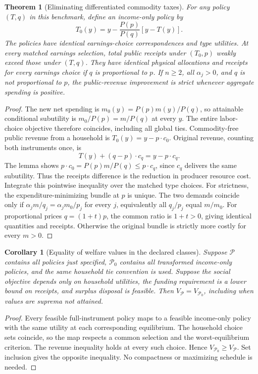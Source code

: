 \documentclass[11pt]{article}
\newtheorem{theorem}{Theorem}
\newtheorem{corollary}{Corollary}
\theoremstyle{definition}
\begin{document}
\begin{theorem}[Eliminating differentiated commodity taxes]
For any policy $(T,q)$ in this benchmark, define an income-only policy by
\[
 T_0(y)=y-\frac{P(p)}{P(q)}[y-T(y)].
\]
The policies have identical earnings-choice correspondences and type utilities. At every matched earnings selection, total public receipts under $(T_0,p)$ weakly exceed those under $(T,q)$. They have identical physical allocations and receipts for every earnings choice if $q$ is proportional to $p$. If $n\geq2$, all $\alpha_j>0$, and $q$ is not proportional to $p$, the public-revenue improvement is strict whenever aggregate spending is positive.
\end{theorem}
\begin{proof}
The new net spending is $m_0(y)=P(p)m(y)/P(q)$, so attainable conditional subutility is $m_0/P(p)=m/P(q)$ at every $y$. The entire labor-choice objective therefore coincides, including all global ties. Commodity-free public revenue from a household is $T_0(y)=y-p\cdot c_0$. Original revenue, counting both instruments once, is
\[
 T(y)+(q-p)\cdot c_q=y-p\cdot c_q.
\]
The lemma shows $p\cdot c_0=P(p)m/P(q)\leq p\cdot c_q$, since $c_q$ delivers the same subutility. Thus the receipts difference is the reduction in producer resource cost. Integrate this pointwise inequality over the matched type choices.
For strictness, the expenditure-minimizing bundle at $p$ is unique. The two demands coincide only if $\alpha_jm/q_j=\alpha_jm_0/p_j$ for every $j$, equivalently all $q_j/p_j$ equal $m/m_0$. For proportional prices $q=(1+t)p$, the common ratio is $1+t>0$, giving identical quantities and receipts. Otherwise the original bundle is strictly more costly for every $m>0$.
\end{proof}

\begin{corollary}[Equality of welfare values in the declared classes]
Suppose $\mathcal P$ contains all policies just specified, $\mathcal P_0$ contains all transformed income-only policies, and the same household tie convention is used. Suppose the social objective depends only on household utilities, the funding requirement is a lower bound on receipts, and surplus disposal is feasible. Then $V_{\mathcal P}=V_{\mathcal P_0}$, including when values are suprema not attained.
\end{corollary}
\begin{proof}
Every feasible full-instrument policy maps to a feasible income-only policy with the same utility at each corresponding equilibrium. The household choice sets coincide, so the map respects a common selection and the worst-equilibrium criterion. The revenue inequality holds at every such choice. Hence $V_{\mathcal P_0}\geq V_{\mathcal P}$. Set inclusion gives the opposite inequality. No compactness or maximizing schedule is needed.
\end{proof}
\end{document}
